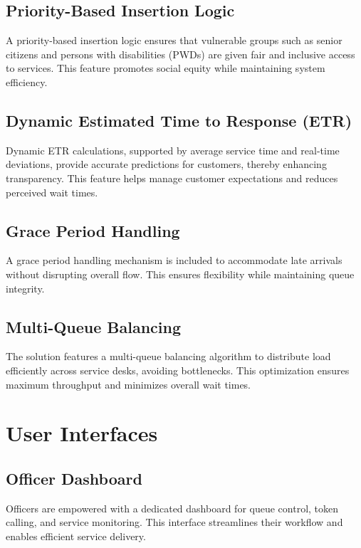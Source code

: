 \documentclass[12pt,a4paper]{report}
\begin{document}
\subsection{Priority-Based Insertion Logic}

A priority-based insertion logic ensures that vulnerable groups such as senior citizens and persons with disabilities (PWDs) are given fair and inclusive access to services. This feature promotes social equity while maintaining system efficiency.

\subsection{Dynamic Estimated Time to Response (ETR)}

Dynamic ETR calculations, supported by average service time and real-time deviations, provide accurate predictions for customers, thereby enhancing transparency. This feature helps manage customer expectations and reduces perceived wait times.

\subsection{Grace Period Handling}

A grace period handling mechanism is included to accommodate late arrivals without disrupting overall flow. This ensures flexibility while maintaining queue integrity.

\subsection{Multi-Queue Balancing}

The solution features a multi-queue balancing algorithm to distribute load efficiently across service desks, avoiding bottlenecks. This optimization ensures maximum throughput and minimizes overall wait times.

\section{User Interfaces}

\subsection{Officer Dashboard}

Officers are empowered with a dedicated dashboard for queue control, token calling, and service monitoring. This interface streamlines their workflow and enables efficient service delivery.
\end{document}
